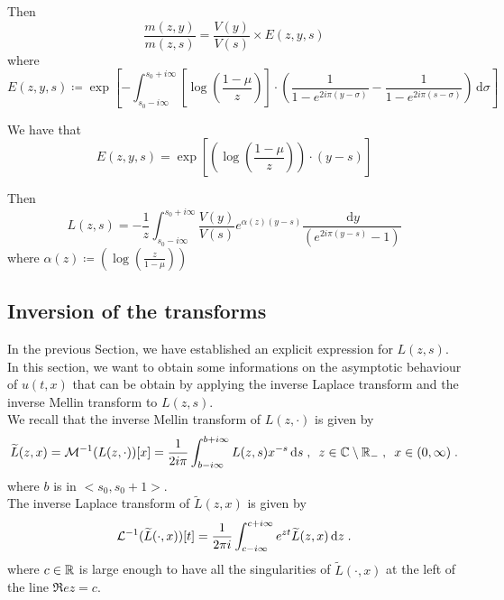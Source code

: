 \documentclass[11pt]{amsart}
\renewcommand{\Re}{\mathfrak{R}e}
\newcommand{\diff}{\,\mathrm{d}}
\begin{document}
Then 
\begin{equation*}
    \frac{m(z,y)}{m(z,s)} 
    = 
    \frac{V(y)}{V(s)} \times E(z,y,s)
\end{equation*}
where $$E(z,y,s) \coloneqq \exp \left[
    - \int_{s_0-i\infty}^{s_0+i\infty} \left[\log \left( \frac{1-\mu}{z}\right) \right]
    \cdot \left(
        \frac{1}{1-e^{2i\pi(y-\sigma)}} - \frac{1}{1-e^{2i\pi(s-\sigma)}}
     \right) \diff \sigma \right]
     $$

We have that
\begin{equation*}
    E(z,y,s) 
    = 
    \exp
        \left[
     \left(\log \left( \frac{1-\mu}{z}\right) \right)
    \cdot (y-s)\right]
\end{equation*}

Then 
\begin{equation*}
    L(z,s) 
    = 
   - \frac{1}{z}\int_{s_0-i\infty}^{s_0+i\infty} \frac{V(y)}{V(s)} e^{ \alpha(z)(y-s)}
   \frac{\diff y}{(e^{2i\pi(y-s)}-1)}
\end{equation*}
where $\alpha(z) \coloneqq  
    \left(\log \left( \frac{z}{1-\mu}\right)\right)$
\subsection{Inversion of the transforms} In the previous Section, we have established an explicit expression for $L(z,s)$. In this section, we want to obtain some informations on the asymptotic behaviour of $u(t,x)$ that can be obtain by applying the inverse Laplace transform and the inverse Mellin transform to $L(z,s)$. \\

We recall that the inverse Mellin transform of $L(z,\cdot)$ is given by 
\begin{equation*}
    \tilde{L}(z,x) = \Mcal^{-1}(L(z, \cdot))[x] = \frac{1}{2i\pi} \int_{b-i\infty}^{b+i\infty} L(z,s)x^{-s}\diff s
    \eqsepv
    z \in \CC \setminus \RR_-
    \eqsepv x \in (0, \infty)
    \eqfinp
\end{equation*}
where $b$ is in $<s_0, s_0+1>$.\\
The inverse Laplace transform of $\tilde{L}(z,x)$ is given by 
\begin{equation*}
     \Lcal^{-1}(\tilde L(\cdot, x))[t] 
     = \frac{1}{2\pi i} \int_{c-i\infty}^{c+i\infty} e^{zt}\tilde L(z,x) \diff z
     \eqfinp
\end{equation*}
where $c \in \mathbb{R}$ is large enough to have all the singularities of $\tilde L(\cdot,x)$ at the left of the line $\Re z = c$. 
\medskip
\end{document}

